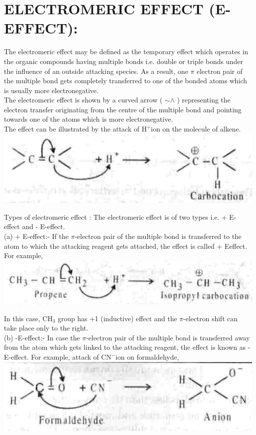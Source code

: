 \documentclass[10pt]{article}
\begin{document}
\section*{ELECTROMERIC EFFECT (E-EFFECT):}
The electromeric effect may be defined as the temporary effect which operates in the organic compounds having multiple bonds i.e. double or triple bonds under the influence of an outside attacking species. As a result, one $\pi$ electron pair of the multiple bond gets completely transferred to one of the bonded atoms which is usually more electronegative.\\
The electromeric effect is shown by a curved arrow ( $\sim \wedge$ ) representing the electron transfer originating from the centre of the multiple bond and pointing towards one of the atoms which is more electronegative.\\
The effect can be illustrated by the attack of $\mathrm{H}^{+}$ion on the molecule of alkene.\\
\includegraphics[max width=\textwidth, center]{2025_01_28_8470952b98110cec3aabg-068(1)}

Types of electromeric effect : The electromeric effect is of two types i.e. + E-effect and - E-effect.\\
(a) + E-effect:- If the $\pi$-electron pair of the multiple bond is transferred to the atom to which the attacking reagent gets attached, the effect is called + Eeffect. For example,\\
\includegraphics[max width=\textwidth, center]{2025_01_28_8470952b98110cec3aabg-068}

In this case, $\mathrm{CH}_{3}$ group has +1 (inductive) effect and the $\pi$-electron shift can take place only to the right.\\
(b) -E-effect:- In case the $\pi$-electron pair of the multiple bond is transferred away from the atom which gets linked to the attacking reagent, the effect is known as -E-effect. For example, attack of $\mathrm{CN}^{-}$ion on formaldehyde,\\
\includegraphics[max width=\textwidth, center]{2025_01_28_8470952b98110cec3aabg-069(2)}
\end{document}
